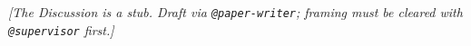 
\textit{[The Discussion is a stub. Draft via \texttt{@paper-writer}; framing must be cleared with \texttt{@supervisor} first.]}
